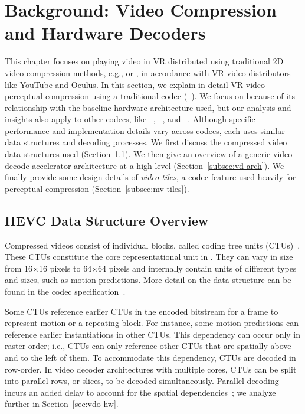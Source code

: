 \section{Background: Video Compression and Hardware Decoders}
\vdecBaselineArchFigure

This chapter focuses on playing video in VR distributed using traditional 2D video compression methods, e.g., \hevc or \vpnine, in accordance with VR video distributors like YouTube and Oculus.
In this section, we explain in detail VR video perceptual compression using a traditional codec (\hevc~\cite{hevc}).
We focus on \hevc because of its relationship with the baseline hardware architecture used, but our analysis and insights also apply to other codecs, like \vpnine~\cite{mukherjee2015technical}, \avc~\cite{h264spec}, and \avone~\cite{avone}.
Although specific performance and implementation details vary across codecs, each uses similar data structures and decoding processes.
We first discuss the compressed video data structures used (Section~\ref{subsec:hevc}).
We then give an overview of a generic video decode accelerator architecture at a high level (Section~\ref{subsec:vd-arch}).
We finally provide some design details of \emph{video tiles}, a codec feature used heavily for perceptual compression (Section~\ref{subsec:mv-tiles}).

\subsection{HEVC Data Structure Overview}
\label{subsec:hevc}

Compressed \hevc videos consist of individual blocks, called coding tree units (CTUs)~\cite{hevc}.
These CTUs constitute the core representational unit in \hevc.
They can vary in size from 16$\times$16 pixels to 64$\times$64 pixels and internally contain units of different types and sizes, such as motion predictions.
More detail on the \hevc data structure can be found in the codec specification~\cite{hevc}.

Some CTUs reference earlier CTUs in the encoded bitstream for a frame to represent motion or a repeating block.
For instance, some motion predictions can reference earlier instantiations in other CTUs.
This dependency can occur only in raster order; i.e., CTUs can only reference other CTUs that are spatially above and to the left of them.
To accommodate this dependency, CTUs are decoded in row-order.
In video decoder architectures with multiple cores, CTUs can be split into parallel rows, or slices, to be decoded simultaneously.
Parallel decoding incurs an added delay to account for the spatial dependencies~\cite{hevcThesis}; we analyze further in Section~\ref{sec:vdo-hw}.

